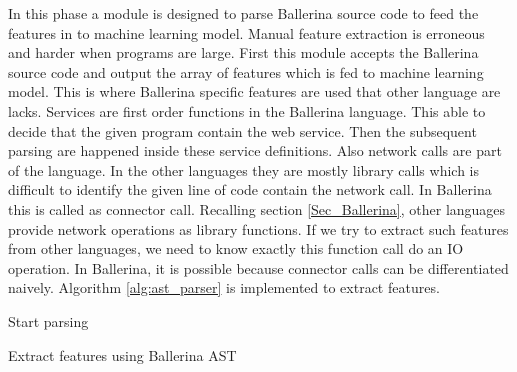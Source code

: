 In this phase a module is designed to parse Ballerina source code to feed the features in to machine learning model. Manual feature extraction is erroneous and harder when programs are large. First this module accepts the Ballerina source code and output the array of features which is fed to machine learning model. This is where Ballerina specific features are used that other language are lacks. 
Services are first order functions in the Ballerina language. This able to decide that the given program contain the web service. Then the subsequent parsing are happened inside these service definitions. Also network calls are part of the language. In the other languages they are mostly library calls which is difficult to identify the given line of code contain the network call. In Ballerina this is called as connector call. Recalling section \ref{Sec_Ballerina}, other languages provide network operations as library functions. If we try to extract such features from other languages, we need to know exactly this function call do an IO operation. In Ballerina, it is possible because connector calls can be differentiated naively. Algorithm \ref{alg:ast_parser} is implemented to extract features.

\begin{algorithm}
	\label{alg:ast_parser}
	\SetAlgoLined
	Start parsing\;
	
	
	\caption{Extract features using Ballerina AST}
\end{algorithm}

